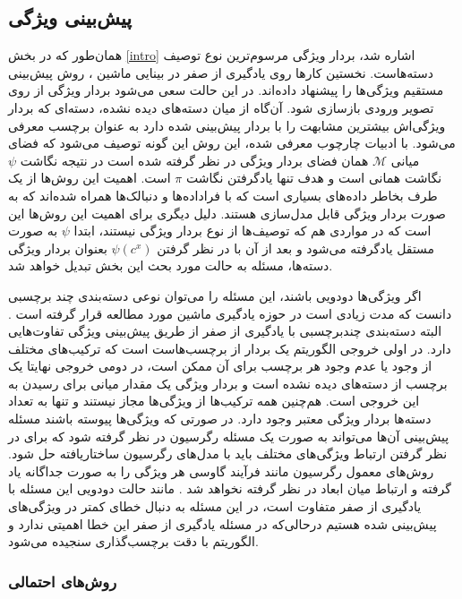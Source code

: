\subsection{پیش‌بینی ویژگی}
همان‌طور که در بخش \ref{intro} اشاره شد، بردار ویژگی مرسوم‌ترین نوع توصیف دسته‌هاست. نخستین کارها روی یادگیری از صفر در بینایی ماشین \cite{lampert09, farhadi09}،
روش پیش‌بینی مستقیم ویژگی‌ها را پیشنهاد داده‌اند. در این حالت سعی می‌شود بردار ویژگی از روی تصویر ورودی بازسازی شود. آن‌گاه از میان دسته‌های دیده نشده، دسته‌ای که بردار ویژگی‌اش بیشترین مشابهت را با بردار پیش‌بینی شده دارد به عنوان برچسب معرفی می‌شود. با ادبیات چارچوب معرفی شده، این روش این گونه توصیف می‌شود که فضای میانی  $ \mathcal{M} $ همان فضای بردار ویژگی در نظر گرفته شده است در نتیجه نگاشت $\psi$ نگاشت همانی است و هدف تنها یادگرفتن نگاشت $\pi$ است. اهمیت این روش‌ها از یک طرف بخاطر داده‌های بسیاری است که با فراداده‌ها  و دنبالک‌ها  همراه شده‌اند که به صورت بردار ویژگی قابل مدل‌سازی هستند. دلیل دیگری برای اهمیت این روش‌ها این است که در مواردی هم که توصیف‌ها از نوع بردار ویژگی نیستند، ابتدا $\psi$ به صورت مستقل یادگرفته می‌شود و بعد از آن با در نظر گرفتن   $ \psi(c^x) $ بعنوان بردار ویژگی دسته‌ها، مسئله به حالت مورد بحث این بخش تبدیل خواهد شد.  

 
 اگر ویژگی‌ها دودویی باشند، این مسئله را می‌توان نوعی دسته‌بندی چند برچسبی  دانست که مدت زیادی است در حوزه یادگیری ماشین مورد مطالعه قرار گرفته است \cite{multilabel}. البته دسته‌بندی چندبرچسبی با یادگیری از صفر از طریق پیش‌بینی ویژگی تفاوت‌هایی دارد. در اولی خروجی الگوریتم یک بردار از برچسب‌هاست است که ترکیب‌های مختلف از وجود یا عدم وجود هر برچسب برای آن ممکن است، در دومی خروجی نهایتا یک برچسب از دسته‌های دیده نشده است و بردار ویژگی یک مقدار میانی برای رسیدن به این خروجی است. هم‌چنین همه ترکیب‌ها از ویژگی‌ها مجاز نیستند و تنها به تعداد دسته‌ها بردار ویژگی معتبر وجود دارد. در صورتی که ویژگی‌ها پیوسته باشند مسئله پیش‌بینی آن‌ها می‌تواند به صورت یک مسئله رگرسیون در نظر گرفته شود که برای در نظر گرفتن ارتباط ویژگی‌های مختلف باید با مدل‌های 
 رگرسیون ساختاریافته  \cite{elements} حل شود. روش‌های معمول رگرسیون مانند فرآیند گاوسی هر ویژگی را به صورت جداگانه یاد گرفته و ارتباط میان ابعاد در نظر گرفته نخواهد شد \cite{mohamed13}. مانند حالت دودویی این مسئله با یادگیری از صفر متفاوت است، در این مسئله به دنبال خطای کمتر در ویژگی‌های پیش‌بینی شده هستیم درحالی‌که در مسئله یادگیری از صفر این خطا اهمیتی ندارد و الگوریتم با دقت برچسب‌گذاری سنجیده می‌شود. 
\subsubsection{روش‌های احتمالی}\label{prob}

